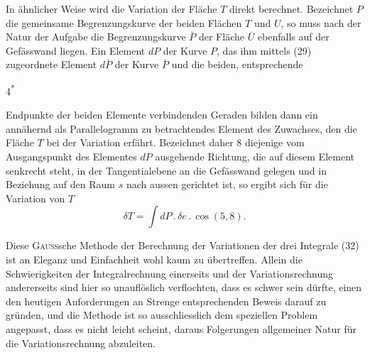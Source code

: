 In ähnlicher Weise wird die Variation der Fläche $T$ direkt berechnet.
Bezeichnet $P$ die gemeinsame Begrenzungskurve der beiden Flächen $T$ und
$U$, so muss nach der Natur der Aufgabe die Begrenzungskurve $\bar P$ der Fläche
$\bar U$ ebenfalls auf der Gefässwand liegen. Ein Element $dP$ der Kurve $P$, das
ihm mittels (29) zugeordnete Element $d\bar P$ der Kurve $\bar P$ und die beiden, entsprechende
\par\smallskip\noindent\hfill{\small 4\textsuperscript{*}}\par
\clearpage{}
\noindent Endpunkte der beiden Elemente verbindenden Geraden bilden
dann ein annähernd als Parallelogramm zu betrachtendes Element des Zuwachses,
den die Fläche $T$ bei der Variation erfährt. Bezeichnet daher 8 diejenige
vom Ausgangspunkt des Elementes $dP$ ausgehende Richtung, die auf
diesem Element senkrecht steht, in der Tangentialebene an die Gefässwand
gelegen und in Beziehung auf den Raum $s$ nach aussen gerichtet ist, so ergibt
sich für die Variation von $T$
\begin{equation*}
\delta T=\int dP\mathbin{.}\delta e\mathbin{.}\cos(5,8).\tag{35}
\end{equation*}

Diese \textsc{Gauss}sche Methode der Berechnung der Variationen der drei Integrale
(32) ist an Eleganz und Einfachheit wohl kaum zu übertreffen. Allein
die Schwierigkeiten der Integralrechnung einerseits und der Variationsrechnung
andererseits sind hier so unauflöslich verflochten, dass es schwer sein dürfte,
einen den heutigen Anforderungen an Strenge entsprechenden Beweis darauf
zu gründen, und die Methode ist so ausschliesslich dem speziellen Problem
angepasst, dass es nicht leicht scheint, daraus Folgerungen allgemeiner Natur
für die Variationsrechnung abzuleiten.

